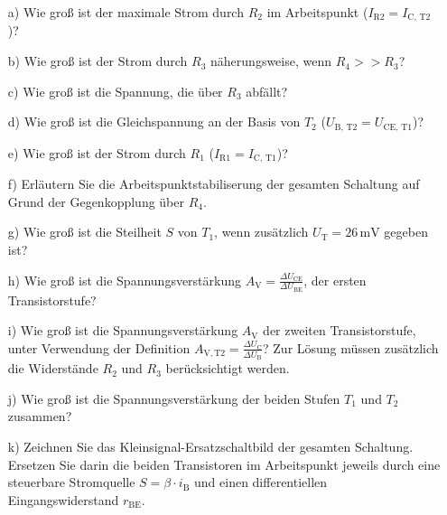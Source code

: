 {  \begin{itemize}
    \item[a)]
          Wie groß ist der maximale Strom durch $R_2$ im Arbeitspunkt ($I_\mathrm{R2}=I_\mathrm{C,\,T2}$)?
    \item[b)]
          Wie groß ist der Strom durch $R_3$ näherungsweise, wenn $R_4 >> R_3$?
    \item[c)]
          Wie groß ist die Spannung, die über $R_3$ abfällt?
    \item[d)]
          Wie groß ist die Gleichspannung an der Basis von $T_2$ ($U_\mathrm{B,\,T2}=U_\mathrm{CE,\,T1}$)?
    \item[e)]
          Wie groß ist der Strom durch $R_1$ ($I_\mathrm{R1}=I_\mathrm{C,\,T1}$)?
    \item[f)]
          Erläutern Sie die Arbeitspunktstabiliserung der gesamten Schaltung auf Grund der Gegenkopplung über $R_4$.
    \item[g)]
          Wie groß ist die Steilheit $S$ von $T_\mathrm{1}$, wenn zusätzlich $U_\mathrm{T} = 26\, \mathrm{mV}$ gegeben ist?
    \item[h)]
          Wie groß ist die Spannungsverstärkung $A_\mathrm{V} = \frac{\Delta U_\mathrm{CE}}{\Delta U_\mathrm{BE}}$, der ersten Transistorstufe?
    \item[i)]
          Wie groß ist die Spannungsverstärkung $A_\mathrm{V}$ der zweiten Transistorstufe, unter Verwendung der Definition $A_\mathrm{V,T2}=\frac{\Delta U_\mathrm{C}}{\Delta U_\mathrm{B}}$?
          Zur Lösung müssen zusätzlich die Widerstände $R_2$ und $R_3$ berücksichtigt werden.
    \item[j)]
          Wie groß ist die Spannungsverstärkung der beiden Stufen $T_\mathrm{1}$ und $T_\mathrm{2}$ zusammen?
    \item[k)]
          Zeichnen Sie das Kleinsignal-Ersatzschaltbild der gesamten Schaltung. Ersetzen Sie darin die beiden Transistoren im Arbeitspunkt jeweils durch eine steuerbare Stromquelle $S=\beta\cdot i_\mathrm{B}$ und einen differentiellen Eingangswiderstand $r_\mathrm{BE}$.
  \end{itemize}
}



